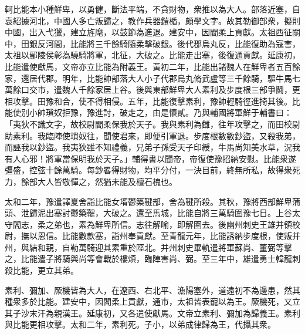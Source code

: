 
\begin{pinyinscope}
軻比能本小種鮮卑，以勇健，斷法平端，不貪財物，衆推以為大人。部落近塞，自袁紹據河北，中國人多亡叛歸之，教作兵器鎧楯，頗學文字。故其勒御部衆，擬則中國，出入弋獵，建立旌麾，以鼓節為進退。建安中，因閻柔上貢獻。太祖西征關中，田銀反河間，比能將三千餘騎隨柔擊破銀。後代郡烏丸反，比能復助為寇害，太祖以鄢陵侯彰為驍騎將軍，北征，大破之。比能走出塞，後復通貢獻。延康初，比能遣使獻馬，文帝亦立比能為附義王。黃初二年，比能出諸魏人在鮮卑者五百餘家，還居代郡。明年，比能帥部落大人小子代郡烏丸脩武盧等三千餘騎，驅牛馬七萬餘口交市，遣魏人千餘家居上谷。後與東部鮮卑大人素利及步度根三部爭鬪，更相攻擊。田豫和合，使不得相侵。五年，比能復擊素利，豫帥輕騎徑進掎其後。比能使別小帥瑣奴拒豫，豫進討，破走之，由是懷貳。乃與輔國將軍鮮于輔書曰：「夷狄不識文字，故校尉閻柔保我於天子。我與素利為讎，往年攻擊之，而田校尉助素利。我臨陣使瑣奴往，聞使君來，即便引軍退。步度根數數鈔盜，又殺我弟，而誣我以鈔盜。我夷狄雖不知禮義，兄弟子孫受天子印綬，牛馬尚知美水草，況我有人心邪！將軍當保明我於天子。」輔得書以聞帝，帝復使豫招納安慰。比能衆遂彊盛，控弦十餘萬騎。每鈔畧得財物，均平分付，一決目前，終無所私，故得衆死力，餘部大人皆敬憚之，然猶未能及檀石槐也。

太和二年，豫遣譯夏舍詣比能女壻鬱築鞬部，舍為鞬所殺。其秋，豫將西部鮮卑蒲頭、泄歸泥出塞討鬱築鞬，大破之。還至馬城，比能自將三萬騎圍豫七日。上谷太守閻志，柔之弟也，素為鮮卑所信。志往解喻，即解圍去。後幽州刺史王雄并領校尉，撫以恩信。比能數款塞，詣州奉貢獻。至青龍元年，比能誘納步度根，使叛并州，與結和親，自勒萬騎迎其累重於陘北。并州刺史畢軌遣將軍蘇尚、董弼等擊之，比能遣子將騎與尚等會戰於樓煩，臨陣害尚、弼。至三年中，雄遣勇士韓龍刺殺比能，更立其弟。

素利、彌加、厥機皆為大人，在遼西、右北平、漁陽塞外，道遠初不為邊患，然其種衆多於比能。建安中，因閻柔上貢獻，通市，太祖皆表寵以為王。厥機死，又立其子沙末汗為親漢王。延康初，又各遣使獻馬。文帝立素利、彌加為歸義王。素利與比能更相攻擊。太和二年，素利死。子小，以弟成律歸為王，代攝其衆。


\end{pinyinscope}